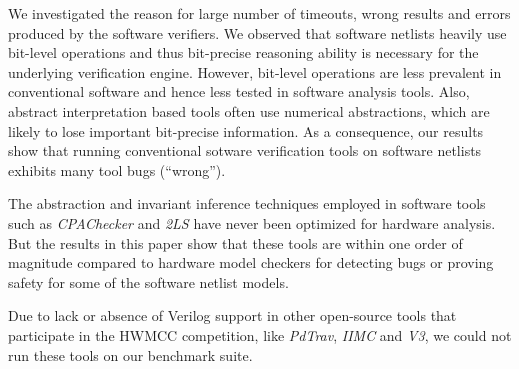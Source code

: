 




 We investigated the reason for large
number of timeouts, wrong results and errors produced by the software
verifiers.  We observed that software netlists heavily use bit-level 
operations and thus bit-precise reasoning ability is necessary for 
the underlying verification engine. However, bit-level operations 
are less prevalent in conventional software and hence less tested 
in software analysis tools. Also, abstract interpretation based tools 
often use numerical abstractions, which are likely to lose 
important bit-precise information.  As a consequence, 
our results show that running conventional sotware verification 
tools on software netlists exhibits many tool bugs (``wrong'').

The abstraction and invariant inference techniques employed in
software tools such as \emph{CPAChecker} and \emph{2LS} have never
been optimized for hardware analysis. But the results in this paper
show that these tools are within one order of magnitude compared to
hardware model checkers for detecting bugs or proving safety for some
of the software netlist models.  

Due to lack or absence of Verilog support in other open-source tools that
participate in the HWMCC competition, like \emph{PdTrav}, \emph{IIMC} and 
\emph{V3}, we could not run these tools on our benchmark suite. 


